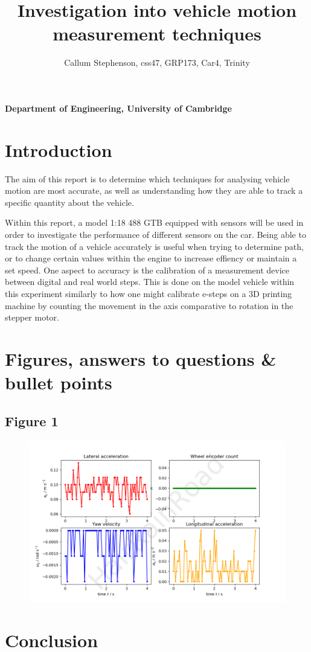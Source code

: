 \documentclass[12pt]{article}
\title{\textbf{Investigation into vehicle motion measurement techniques}}
\author{Callum Stephenson, css47, GRP173, Car4, Trinity}
\date{}
\begin{document}
    \begin{titlepage}
        \maketitle
        \thispagestyle{empty}
        \vspace{13cm}
        \textbf{Department of Engineering, University of Cambridge}
    \end{titlepage}
    \tableofcontents
    \newpage
    \section{Introduction}
    The aim of this report is to determine which techniques for analysing vehicle motion are most accurate, as well as 
    understanding how they are able to track a specific quantity about the vehicle. 
    
    Within this report, a model 1:18 488 GTB equipped with sensors will be used in order to investigate the performance of
    different sensors on the car. Being able to track the motion of a vehicle accurately is useful when trying to determine path,
    or to change certain values within the engine to increase effiency or maintain a set speed. One aspect to accuracy is the calibration of
    a measurement device between digital and real world steps. This is done on the model vehicle within this experiment similarly to
    how one might calibrate e-steps on a 3D printing machine by counting the movement in the axis comparative to rotation in the stepper motor.
    \newpage
    \section{Figures, answers to questions \& bullet points}
    \subsection{Figure 1}
    \begin{figure}[H]
    \includegraphics[width=35pc]{fig1png.png}\label{figure1}
    \caption{}
    \end{figure}
    \section{Conclusion}
    \begin{thebibliography}{99}
        
    \end{thebibliography}
\end{document}
